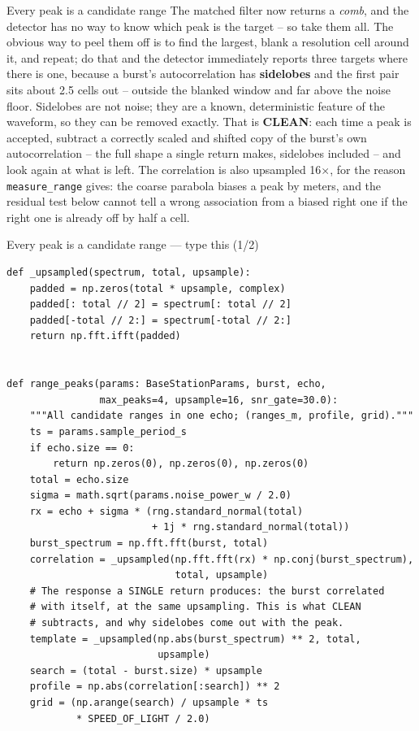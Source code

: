 \documentclass[10pt]{beamer}
\begin{document}
\begin{frame}{Every peak is a candidate range}
  The matched filter now returns a \emph{comb}, and the
  detector has no way to know which peak is the target --
  so take them all. The obvious way to peel them off is to
  find the largest, blank a resolution cell around it, and
  repeat; do that and the detector immediately reports
  three targets where there is one, because a burst's
  autocorrelation has \textbf{sidelobes} and the first
  pair sits about 2.5 cells out -- outside the blanked
  window and far above the noise floor. Sidelobes are not
  noise; they are a known, deterministic feature of the
  waveform, so they can be removed exactly. That is
  \textbf{CLEAN}: each time a peak is accepted, subtract a
  correctly scaled and shifted copy of the burst's own
  autocorrelation -- the full shape a single return makes,
  sidelobes included -- and look again at what is left.
  The correlation is also upsampled 16$\times$, for the
  reason \texttt{measure\_range} gives: the coarse
  parabola biases a peak by meters, and the residual test
  below cannot tell a wrong association from a biased
  right one if the right one is already off by half a cell.
\end{frame}

\begin{frame}[fragile]{Every peak is a candidate range --- type this (1/2)}
\begin{lstlisting}[basicstyle=\ttfamily\tiny]
def _upsampled(spectrum, total, upsample):
    padded = np.zeros(total * upsample, complex)
    padded[: total // 2] = spectrum[: total // 2]
    padded[-total // 2:] = spectrum[-total // 2:]
    return np.fft.ifft(padded)


def range_peaks(params: BaseStationParams, burst, echo,
                max_peaks=4, upsample=16, snr_gate=30.0):
    """All candidate ranges in one echo; (ranges_m, profile, grid)."""
    ts = params.sample_period_s
    if echo.size == 0:
        return np.zeros(0), np.zeros(0), np.zeros(0)
    total = echo.size
    sigma = math.sqrt(params.noise_power_w / 2.0)
    rx = echo + sigma * (rng.standard_normal(total)
                         + 1j * rng.standard_normal(total))
    burst_spectrum = np.fft.fft(burst, total)
    correlation = _upsampled(np.fft.fft(rx) * np.conj(burst_spectrum),
                             total, upsample)
    # The response a SINGLE return produces: the burst correlated
    # with itself, at the same upsampling. This is what CLEAN
    # subtracts, and why sidelobes come out with the peak.
    template = _upsampled(np.abs(burst_spectrum) ** 2, total,
                          upsample)
    search = (total - burst.size) * upsample
    profile = np.abs(correlation[:search]) ** 2
    grid = (np.arange(search) / upsample * ts
            * SPEED_OF_LIGHT / 2.0)
\end{lstlisting}
\end{frame}
\end{document}
